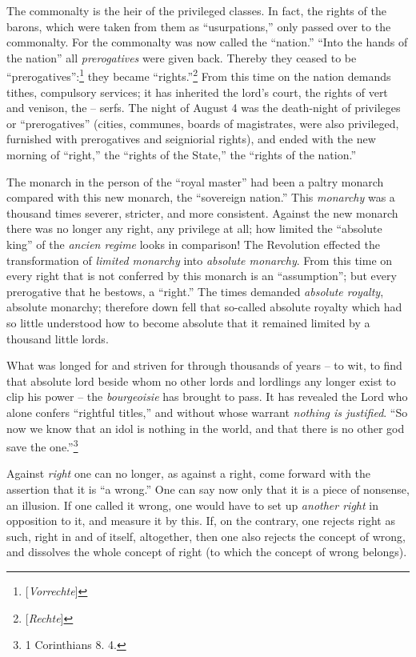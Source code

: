 The commonalty is the heir of the privileged classes. In fact, the rights of 
the barons, which were taken from them as ``usurpations,'' only passed over 
to the commonalty. For the commonalty was now called the ``nation.'' ``Into 
the hands of the nation'' all \textit{prerogatives} were given back. Thereby 
they ceased to be ``prerogatives'':\footnote{[\textit{Vorrechte}]} they 
became ``rights.''\footnote{[\textit{Rechte}]} From this time on the nation 
demands tithes, compulsory services; it has inherited the lord's court, the 
rights of vert and venison, the -- serfs. The night of August 4 was the 
death-night of privileges or ``prerogatives'' (cities, communes, boards of 
magistrates, were also privileged, furnished with prerogatives and seigniorial 
rights), and ended with the new morning of ``right,'' the ``rights of the 
State,'' the ``rights of the nation.''

The monarch in the person of the ``royal master'' had been a paltry monarch 
compared with this new monarch, the ``sovereign nation.'' This 
\textit{monarchy} was a thousand times severer, stricter, and more consistent. 
Against the new monarch there was no longer any right, any privilege at all; 
how limited the ``absolute king'' of the \textit{ancien regime} looks in 
comparison! The Revolution effected the transformation of \textit{limited 
monarchy} into \textit{absolute monarchy}. From this time on every right that 
is not conferred by this monarch is an ``assumption''; but every prerogative 
that he bestows, a ``right.'' The times demanded \textit{absolute royalty}, 
absolute monarchy; therefore down fell that so-called absolute royalty which 
had so little understood how to become absolute that it remained limited by a 
thousand little lords.

What was longed for and striven for through thousands of years -- to wit, to 
find that absolute lord beside whom no other lords and lordlings any longer 
exist to clip his power -- the \textit{bourgeoisie} has brought to pass. It 
has revealed the Lord who alone confers ``rightful titles,'' and without 
whose warrant \textit{nothing is justified}. ``So now we know that an idol is 
nothing in the world, and that there is no other god save the 
one.''\footnote{1 Corinthians 8. 4.}

Against \textit{right} one can no longer, as against a right, come forward 
with the assertion that it is ``a wrong.'' One can say now only that it is a 
piece of nonsense, an illusion. If one called it wrong, one would have to set 
up \textit{another right} in opposition to it, and measure it by this. If, on 
the contrary, one rejects right as such, right in and of itself, altogether, 
then one also rejects the concept of wrong, and dissolves the whole concept of 
right (to which the concept of wrong belongs).

